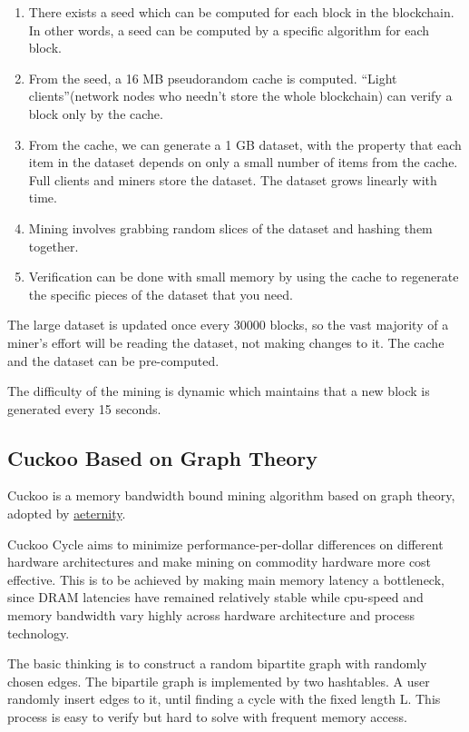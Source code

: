 \documentclass[11pt]{article}
\begin{document}
\begin{enumerate}
\item There exists a seed which can be computed for each block in the blockchain. In other words, a seed can be computed by a specific algorithm for each block.
\item From the seed, a 16 MB pseudorandom cache is computed. ``Light clients''(network nodes who needn't store the whole blockchain) can verify a block only by the cache.
\item From the cache, we can generate a 1 GB dataset, with the property that each item in the dataset depends on only a small number of items from the cache. Full clients and miners store the dataset. The dataset grows linearly with time.
\item Mining involves grabbing random slices of the dataset and hashing them together. \item Verification can be done with small memory by using the cache to regenerate the specific pieces of the dataset that you need.
\end{enumerate}

The large dataset is updated once every 30000 blocks, so the vast majority of a miner's effort will be reading the dataset, not making changes to it. The cache and the dataset can be pre-computed.

The difficulty of the mining is dynamic which maintains that a new block is generated every 15 seconds.

\subsection{Cuckoo Based on Graph Theory}

Cuckoo is a memory bandwidth bound mining algorithm based on graph theory\cite{tromp2014cuckoo}, adopted by  \href{https://aeternity.com/}{aeternity}.
 
Cuckoo Cycle aims to minimize performance-per-dollar differences on different hardware architectures and make mining on commodity hardware more cost effective. This is to be achieved by making main memory latency a bottleneck, since DRAM latencies have remained relatively stable while cpu-speed and memory bandwidth vary highly across hardware architecture and process technology. 

The basic thinking is to construct a random bipartite graph with randomly chosen edges. The bipartile graph is implemented by two hashtables. A user randomly insert edges to it, until finding a cycle with the fixed length L. This process is easy to verify but hard to solve with frequent memory access.
\end{document}
